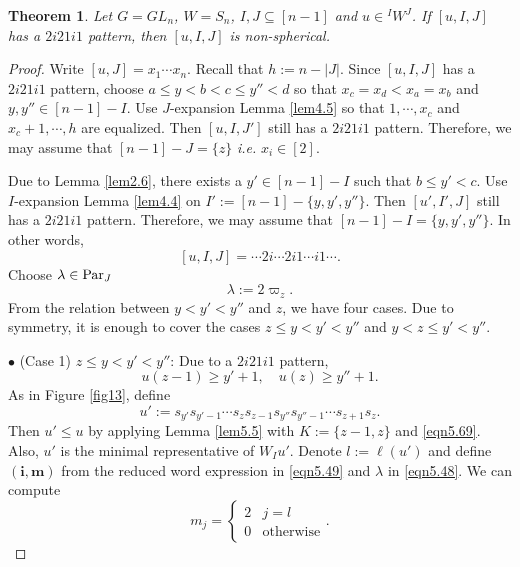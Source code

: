 \documentclass[12pt]{amsart}
\newtheorem{theorem}{Theorem}[section]
\theoremstyle{definition}
\theoremstyle{remark}
\newcommand{\Parj}{{\rm Par}_J}
\begin{document}
\begin{theorem}\label{thm5.4}
Let $G= GL_n$, $W=S_n$, $I, J \subseteq [n-1]$ and $u \in {}^I W^J$. If $[u,I,J]$ has a $2i21i1$ pattern, then $[u,I,J]$ is non-spherical.
\end{theorem}
\begin{proof}
Write $[u,J] = x_1  \cdots x_n$. Recall that $h:=n - |J|$. Since $[u,I,J]$ has a $2i21i1$ pattern, choose $a \leq y < b< c \leq y'' <d$ so that $x_c = x_d <x_a = x_b$ and $y,y'' \in [n-1]-I$. Use $J$-expansion Lemma \ref{lem4.5} so that $1 , \cdots , x_c$ and $x_c +1 , \cdots ,  h$ are equalized. Then $[u,I,J']$ still has a $2i21i1$ pattern. Therefore, we may assume that $[n-1]-J = \{ z\}$ \textit{i.e.} $x_i \in [2]$.

Due to Lemma \ref{lem2.6}, there exists a $y' \in [n-1]-I$ such that $b \leq y' < c$. Use $I$-expansion Lemma \ref{lem4.4} on $I' := [n-1]-\{y,y',y''\}$. Then $[u',I',J]$ still has a $2i21i1$ pattern. Therefore, we may assume that $[n-1]-I = \{y,y',y''\}$. In other words,
\begin{equation}\label{eqn5.47}
[u,I,J] =  \cdots 2i \cdots 2i1\cdots i1\cdots .
\end{equation}
Choose $\lambda \in \Parj$
\begin{equation}\label{eqn5.48}
\lambda := 2 \varpi_z.
\end{equation}
From the relation between $y<y'<y''$ and $z$, we have four cases. Due to symmetry, it is enough to cover the cases $z\leq y < y' <y''$ and $y < z \leq y'  < y''$. 

$\bullet$ (Case 1) $z\leq y < y' <y''$: Due to a $2i21i1$ pattern,
\begin{equation}\label{eqn5.69}
u(z-1)\geq y'+1, \quad u(z) \geq y''+1.
\end{equation}
As in Figure \ref{fig13}, define
\begin{equation}\label{eqn5.49}
u':= s_{y'}s_{y'-1} \cdots s_{z}s_{z-1} s_{y''} s_{y''-1} \cdots s_{z+1}s_z.
\end{equation}
Then $u' \leq u$ by applying Lemma \ref{lem5.5} with $K:=\{z-1, z\}$ and \eqref{eqn5.69}. Also, $u'$ is the minimal representative of $W_Iu'$. Denote $l:= \ell (u')$ and define $(\mathbf{i}, \mathbf{m})$ from the reduced word expression in \eqref{eqn5.49} and $\lambda$ in \eqref{eqn5.48}. We can compute
\begin{equation}\label{eqn5.50}
m_j = 
\begin{cases}
2 & j = l \\
0 & \text{otherwise}
\end{cases}
.
\end{equation}


\end{proof}
\end{document}
